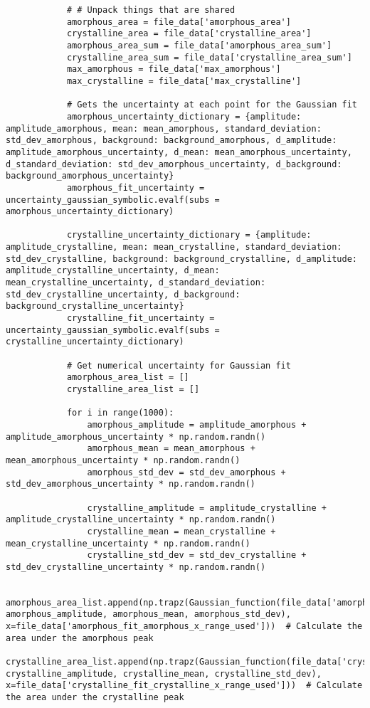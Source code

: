 \begin{lstlisting}
            # # Unpack things that are shared
            amorphous_area = file_data['amorphous_area']
            crystalline_area = file_data['crystalline_area']
            amorphous_area_sum = file_data['amorphous_area_sum']
            crystalline_area_sum = file_data['crystalline_area_sum']
            max_amorphous = file_data['max_amorphous']
            max_crystalline = file_data['max_crystalline']

            # Gets the uncertainty at each point for the Gaussian fit
            amorphous_uncertainty_dictionary = {amplitude: amplitude_amorphous, mean: mean_amorphous, standard_deviation: std_dev_amorphous, background: background_amorphous, d_amplitude: amplitude_amorphous_uncertainty, d_mean: mean_amorphous_uncertainty, d_standard_deviation: std_dev_amorphous_uncertainty, d_background: background_amorphous_uncertainty}
            amorphous_fit_uncertainty = uncertainty_gaussian_symbolic.evalf(subs = amorphous_uncertainty_dictionary)

            crystalline_uncertainty_dictionary = {amplitude: amplitude_crystalline, mean: mean_crystalline, standard_deviation: std_dev_crystalline, background: background_crystalline, d_amplitude: amplitude_crystalline_uncertainty, d_mean: mean_crystalline_uncertainty, d_standard_deviation: std_dev_crystalline_uncertainty, d_background: background_crystalline_uncertainty}
            crystalline_fit_uncertainty = uncertainty_gaussian_symbolic.evalf(subs = crystalline_uncertainty_dictionary)

            # Get numerical uncertainty for Gaussian fit
            amorphous_area_list = []
            crystalline_area_list = []

            for i in range(1000):
                amorphous_amplitude = amplitude_amorphous + amplitude_amorphous_uncertainty * np.random.randn()
                amorphous_mean = mean_amorphous + mean_amorphous_uncertainty * np.random.randn()
                amorphous_std_dev = std_dev_amorphous + std_dev_amorphous_uncertainty * np.random.randn()

                crystalline_amplitude = amplitude_crystalline + amplitude_crystalline_uncertainty * np.random.randn()
                crystalline_mean = mean_crystalline + mean_crystalline_uncertainty * np.random.randn()
                crystalline_std_dev = std_dev_crystalline + std_dev_crystalline_uncertainty * np.random.randn()

                amorphous_area_list.append(np.trapz(Gaussian_function(file_data['amorphous_fit_amorphous_x_range_used'], amorphous_amplitude, amorphous_mean, amorphous_std_dev), x=file_data['amorphous_fit_amorphous_x_range_used']))  # Calculate the area under the amorphous peak
                crystalline_area_list.append(np.trapz(Gaussian_function(file_data['crystalline_fit_crystalline_x_range_used'], crystalline_amplitude, crystalline_mean, crystalline_std_dev), x=file_data['crystalline_fit_crystalline_x_range_used']))  # Calculate the area under the crystalline peak


\end{lstlisting}
